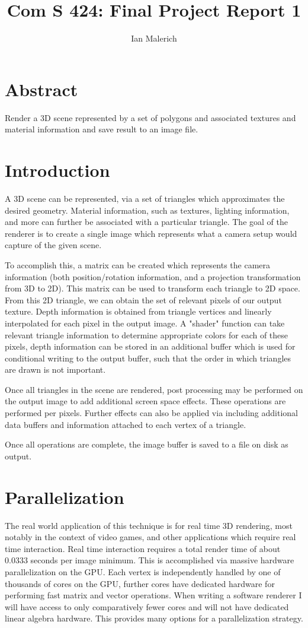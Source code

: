 \documentclass[12pt]{jhwhw}
\author{Ian Malerich}
\title{Com S 424: Final Project Report 1}
\begin{document}
\raggedright

\section*{Abstract}
Render a 3D scene represented by a set of polygons and associated
textures and material information and save result to an image file.

\section*{Introduction}
A 3D scene can be represented, via a set of triangles which approximates
the desired geometry. Material information, such as textures, lighting information,
and more can further be associated with a particular triangle. The goal of the renderer
is to create a single image which represents what a camera setup would capture of the
given scene.

\bigbreak
To accomplish this, a matrix can be created which represents the camera information
(both position/rotation information, and a projection transformation from 3D to 2D).
This matrix can be used to transform each triangle to 2D space. From this 2D triangle,
we can obtain the set of relevant pixels of our output texture. Depth information is
obtained from triangle vertices and linearly interpolated for each pixel in the output image.
A "shader" function can take relevant triangle information to determine appropriate colors
for each of these pixels, depth information can be stored in an additional buffer which
is used for conditional writing to the output buffer, such that the order in which 
triangles are drawn is not important.

\bigbreak
Once all triangles in the scene are rendered, post processing may be performed on the
output image to add additional screen space effects. These operations are performed per 
pixels. Further effects can also be applied via including additional data buffers and
information attached to each vertex of a triangle.

\bigbreak
Once all operations are complete, the image buffer is saved to a file on disk as output.

\section*{Parallelization}
The real world application of this technique is for real time 3D rendering, most notably
in the context of video games, and other applications which require real time interaction.
Real time interaction requires a total render time of about 0.0333 seconds per image 
minimum. This is accomplished via massive hardware parallelization on the GPU. Each vertex
is independently handled by one of thousands of cores on the GPU, further cores have dedicated
hardware for performing fast matrix and vector operations. When writing a software renderer
I will have access to only comparatively fewer cores and will not have dedicated linear 
algebra hardware. This provides many options for a parallelization strategy.
\end{document}
